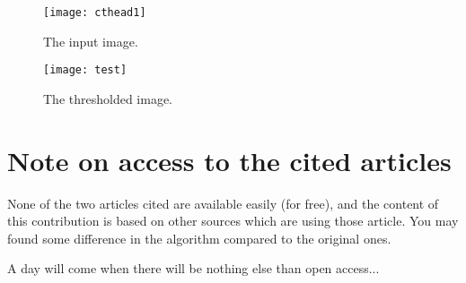 \documentclass{InsightArticle}
\begin{document}




\begin{figure}[htbp]
\centering
\texttt{[image: cthead1]}
\caption{The input image.\label{cthead1}}
\end{figure}

\begin{figure}[htbp]
\centering
\texttt{[image: test]}
\caption{The thresholded image.\label{cthead1}}
\end{figure}


\section{Note on access to the cited articles}
None of the two articles cited are available easily (for free), and the content of
this contribution is based on other sources which are using those article.
You may found some difference in the algorithm compared to the original ones.

A day will come when there will be nothing else than open access...

\appendix





\end{document}

